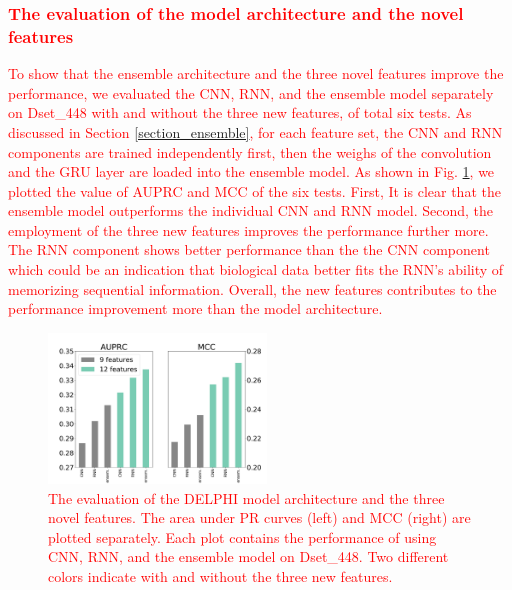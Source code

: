 \documentclass{bioinfo}
\newcommand{\myColor}{red}
\begin{document}
\textcolor{\myColor}{
\subsubsection{The evaluation of the model architecture and the novel features}
To show that the ensemble architecture and the three novel features improve the performance, we evaluated the CNN, RNN, and the ensemble model separately on Dset\_448 with and without the three new features, of total six tests. As discussed in Section \ref{section_ensemble}, for each feature set, the CNN and RNN components are trained independently first, then the weighs of the convolution and the GRU layer are loaded into the ensemble model. As shown in Fig. \ref{fig_CNN_RNN_ensemble}, we plotted the value of AUPRC and MCC of the six tests. First, It is clear that the ensemble model outperforms the individual CNN and RNN model. Second, the employment of the three new features improves the performance further more. The RNN component shows better performance than the the CNN component which could be an indication that biological data better fits the RNN's ability of memorizing sequential information. Overall, the new features contributes to the performance improvement more than the model architecture. }
\begin{figure}
\centering
\includegraphics[width=\columnwidth, height = 4cm]{CNN_RNN_ensemble.pdf}
  \caption{\textcolor{\myColor}{{The evaluation of the DELPHI model architecture and the three novel features.} The area under PR curves (left) and MCC (right) are plotted separately. Each plot contains the performance of using CNN, RNN, and the ensemble model on Dset\_448. Two different colors indicate with and without the three new features.}
  \label{fig_CNN_RNN_ensemble}}
\end{figure}
\end{document}

